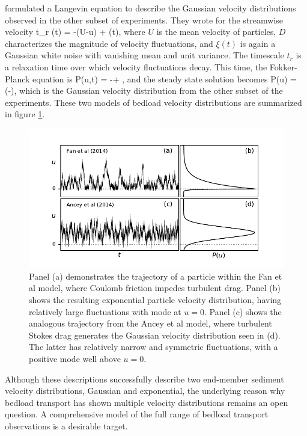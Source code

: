 \citet{Ancey2014} formulated a Langevin equation to describe the Gaussian velocity distributions observed in the other subset of experiments. They wrote for the streamwise velocity 
\be t_r (t) = -(U-u) + \xi(t),\ee
where $U$ is the mean velocity of particles, $D$ characterizes the magnitude of velocity fluctuations, and $\xi(t)$ is again a Gaussian white noise with vanishing mean and unit variance. The timescale $t_r$ is a relaxation time over which velocity fluctuations decay. This time, the Fokker-Planck equation is
\be {} P(u,t) = - + ,\ee 
and the steady state solution becomes
\be P(u) =  \exp\Big(-\Big), \ee
which is the Gaussian velocity distribution from the other subset of the experiments.
These two models of bedload velocity distributions are summarized in figure \ref{fig:fanAncey}.
\begin{figure}[!htbp]
	\includegraphics[width=\linewidth,keepaspectratio]{./figures/ch1/fanAncey.pdf}
	\caption{Panel (a) demonstrates the trajectory of a particle within the Fan et al model, where Coulomb friction impedes turbulent drag. Panel (b) shows the resulting exponential particle velocity distribution, having relatively large fluctuations with mode at $u=0$.
	Panel (c) shows the analogous trajectory from the Ancey et al model, where turbulent Stokes drag generates the Gaussian velocity distribution seen in (d). The latter has relatively narrow and symmetric fluctuations, with a positive mode well above $u=0$.}
	\label{fig:fanAncey}
\end{figure}
Although these descriptions successfully describe two end-member sediment velocity distributions, Gaussian and exponential, the underlying reason why bedload transport has shown multiple velocity distributions remains an open question. A comprehensive model of the full range of bedload transport observations is a desirable target.

